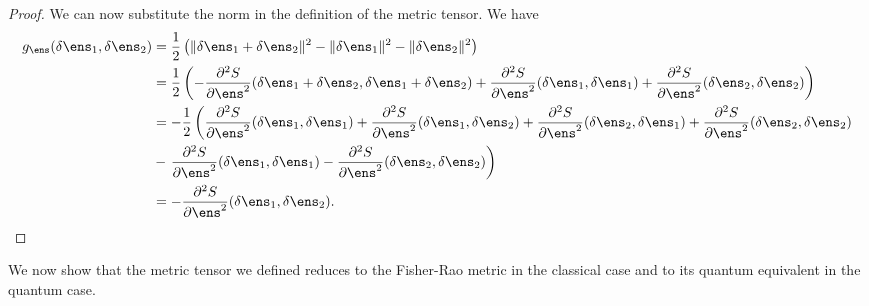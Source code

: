 \begin{mathSection}
\begin{proof}
	We can now substitute the norm in the definition of the metric tensor. We have
	\begin{equation}
		\begin{aligned}
			g_{\ens}(\delta \ens_1, \delta \ens_2 ) &= \frac{1}{2} \left( \lVert \delta \ens_1 + \delta \ens_2 \rVert^2 - \lVert \delta \ens_1 \rVert^2 - \lVert \delta \ens_2 \rVert^2 \right) \\
			&= \frac{1}{2} \left( - \frac{\partial^2 S}{\partial \ens^2} (\delta \ens_1 + \delta \ens_2, \delta \ens_1 + \delta \ens_2) + \frac{\partial^2 S}{\partial \ens^2} (\delta \ens_1, \delta \ens_1) + \frac{\partial^2 S}{\partial \ens^2} (\delta \ens_2, \delta \ens_2) \right) \\
			&= - \frac{1}{2} \left(  \frac{\partial^2 S}{\partial \ens^2} (\delta \ens_1, \delta \ens_1) + \frac{\partial^2 S}{\partial \ens^2} (\delta \ens_1, \delta \ens_2) + \frac{\partial^2 S}{\partial \ens^2} (\delta \ens_2, \delta \ens_1) + \frac{\partial^2 S}{\partial \ens^2} (\delta \ens_2, \delta \ens_2) \right. \\
			&-  \left. \frac{\partial^2 S}{\partial \ens^2} (\delta \ens_1, \delta \ens_1) - \frac{\partial^2 S}{\partial \ens^2} (\delta \ens_2, \delta \ens_2) \right) \\
			&= - \frac{\partial^2 S}{\partial \ens^2} (\delta \ens_1, \delta \ens_2). \\
		\end{aligned}
	\end{equation}
\end{proof}
\end{mathSection}

We now show that the metric tensor we defined reduces to the Fisher-Rao metric in the classical case and to its quantum equivalent in the quantum case.

